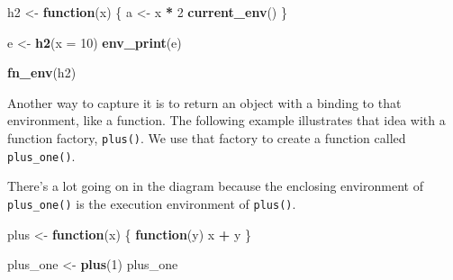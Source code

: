\documentclass[]{book}
\newenvironment{Shaded}{\begin{snugshade}}{\end{snugshade}}
\newcommand{\KeywordTok}[1]{\textcolor[rgb]{0.13,0.29,0.53}{\textbf{#1}}}
\newcommand{\DataTypeTok}[1]{\textcolor[rgb]{0.13,0.29,0.53}{#1}}
\newcommand{\DecValTok}[1]{\textcolor[rgb]{0.00,0.00,0.81}{#1}}
\newcommand{\StringTok}[1]{\textcolor[rgb]{0.31,0.60,0.02}{#1}}
\newcommand{\ControlFlowTok}[1]{\textcolor[rgb]{0.13,0.29,0.53}{\textbf{#1}}}
\newcommand{\OperatorTok}[1]{\textcolor[rgb]{0.81,0.36,0.00}{\textbf{#1}}}
\newcommand{\NormalTok}[1]{#1}
\theoremstyle{definition}
\theoremstyle{definition}
\theoremstyle{definition}
\theoremstyle{remark}
\begin{document}
\begin{Shaded}
\begin{Highlighting}[]
\NormalTok{h2 <-}\StringTok{ }\ControlFlowTok{function}\NormalTok{(x) \{}
\NormalTok{  a <-}\StringTok{ }\NormalTok{x }\OperatorTok{*}\StringTok{ }\DecValTok{2}
  \KeywordTok{current_env}\NormalTok{()}
\NormalTok{\}}

\NormalTok{e <-}\StringTok{ }\KeywordTok{h2}\NormalTok{(}\DataTypeTok{x =} \DecValTok{10}\NormalTok{)}
\KeywordTok{env_print}\NormalTok{(e)}
\end{Highlighting}
\end{Shaded}

\begin{Shaded}
\begin{Highlighting}[]
\KeywordTok{fn_env}\NormalTok{(h2)}
\end{Highlighting}
\end{Shaded}

Another way to capture it is to return an object with a binding to that
environment, like a function. The following example illustrates that
idea with a function factory, \texttt{plus()}. We use that factory to
create a function called \texttt{plus\_one()}.

There's a lot going on in the diagram because the enclosing environment
of \texttt{plus\_one()} is the execution environment of \texttt{plus()}.

\begin{Shaded}
\begin{Highlighting}[]
\NormalTok{plus <-}\StringTok{ }\ControlFlowTok{function}\NormalTok{(x) \{}
  \ControlFlowTok{function}\NormalTok{(y) x }\OperatorTok{+}\StringTok{ }\NormalTok{y}
\NormalTok{\}}

\NormalTok{plus_one <-}\StringTok{ }\KeywordTok{plus}\NormalTok{(}\DecValTok{1}\NormalTok{)}
\NormalTok{plus_one}
\end{Highlighting}
\end{Shaded}
\end{document}

